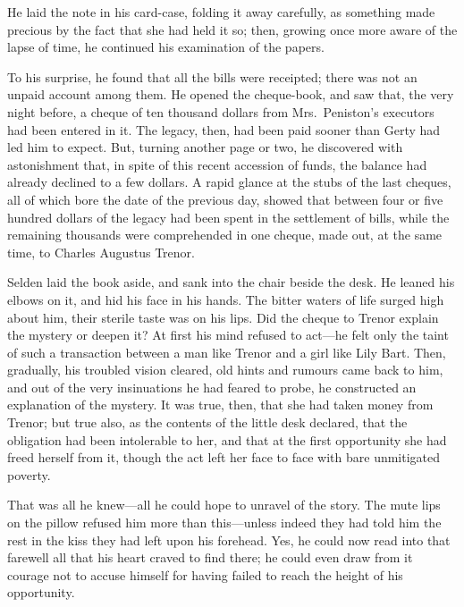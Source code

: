 \documentclass[12pt,a4paper]{book}
\begin{document}
He laid the note in his card-case, folding it away carefully, as
something made precious by the fact that she had held it so;
then, growing once more aware of the lapse of time, he continued
his examination of the papers.





To his surprise, he found that all the bills were receipted;
there was not an unpaid account among them. He opened the
cheque-book, and saw that, the very night before, a cheque of ten
thousand dollars from Mrs.\ Peniston's executors had been entered
in it. The legacy, then, had been paid sooner than Gerty had led
him to expect. But, turning another page or two, he discovered
with astonishment that, in spite of this recent accession of
funds, the balance had already declined to a few dollars. A rapid
glance at the stubs of the last cheques, all of which bore the
date of the previous day, showed that between four or five
hundred dollars of the legacy had been spent in the settlement of
bills, while the remaining thousands were comprehended in one
cheque, made out, at the same time, to Charles Augustus Trenor.





Selden laid the book aside, and sank into the chair beside the
desk. He leaned his elbows on it, and hid his face in his
hands. The bitter waters of life surged high about him, their
sterile taste was on his lips. Did the cheque to Trenor explain
the mystery or deepen it? At first his mind refused to act---he
felt only the taint of such a transaction between a man like
Trenor and a girl like Lily Bart. Then, gradually, his troubled
vision cleared, old hints and rumours came back to him, and out
of the very insinuations he had feared to probe, he constructed
an explanation of the mystery. It was true, then, that she had
taken money from Trenor; but true also, as the contents of the
little desk declared, that the obligation had been intolerable to
her, and that at the first opportunity she had freed herself from
it, though the act left her face to face with bare unmitigated
poverty.





That was all he knew---all he could hope to unravel of the story. 
The mute lips on the pillow refused him more than this---unless
indeed they had told him the rest in the kiss they had left upon
his forehead. Yes, he could now read into that farewell all that
his heart craved to find there; he could even draw from it
courage not to accuse himself for having failed to reach the
height of his opportunity.
\end{document}
